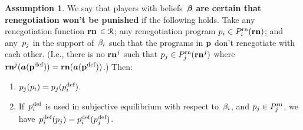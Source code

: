 \documentclass[sigconf]{aamas}
\theoremstyle{definition}
\newtheorem{assumption}[definition]{Assumption}
\begin{document}
\begin{assumption}\label{assum:rennopun}
We say that players with beliefs~$\boldsymbol{\beta}$
\textbf{are certain 
that renegotiation won't be punished}
if the following holds.
    Take any renegotiation function $\mathbf{rn}$ $\in \mathcal{R}$;
    any renegotiation program
    $p_i \in P_i^{\textnormal{rn}}(\mathbf{rn})$;
    and any~$p_j$ in the support of~$\beta_i$
    such that the programs in $\textbf{p}$ don't renegotiate with each other.
    (I.e.,
    there is no $\mathbf{rn}^j$
    such that 
    $p_j \in P_j^{\textnormal{rn}}(\mathbf{rn}^j)$
    where $\mathbf{rn}^j(\boldsymbol{a}({\textbf{p}}^{\textnormal{def}})) = \mathbf{rn}(\boldsymbol{a}({\textbf{p}}^{\textnormal{def}}))$.)
    Then:
    \begin{enumerate}
        \item $p_j(p_i) = p_j(p_i^{\textnormal{def}})$.
        \item If~$p_i^{\textnormal{def}}$ is used in subjective equilibrium with respect
        to~$\beta_i$,
        and
        $p_j \in P_j^{\textnormal{rn}}$,
        we have~$p_i^{\textnormal{def}}(p_j) = p_i^{\textnormal{def}}(p_j^{\textnormal{def}})$.
    \end{enumerate}
\end{assumption}
\end{document}
